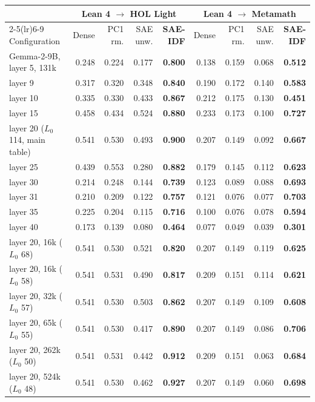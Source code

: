 \begin{tabular}{@{}lrrrrrrrr@{}}
\toprule
 & \multicolumn{4}{c}{Lean 4 $\to$ HOL Light} & \multicolumn{4}{c}{Lean 4 $\to$ Metamath} \\
\cmidrule(lr){2-5}\cmidrule(lr){6-9}
Configuration & Dense & PC1 rm. & SAE unw. & \textbf{SAE-IDF} & Dense & PC1 rm. & SAE unw. & \textbf{SAE-IDF} \\
\midrule
Gemma-2-9B, layer 5, 131k & 0.248 & 0.224 & 0.177 & \textbf{0.800} & 0.138 & 0.159 & 0.068 & \textbf{0.512} \\
layer 9 & 0.317 & 0.320 & 0.348 & \textbf{0.840} & 0.190 & 0.172 & 0.140 & \textbf{0.583} \\
layer 10 & 0.335 & 0.330 & 0.433 & \textbf{0.867} & 0.212 & 0.175 & 0.130 & \textbf{0.451} \\
layer 15 & 0.458 & 0.434 & 0.524 & \textbf{0.880} & 0.233 & 0.173 & 0.100 & \textbf{0.727} \\
layer 20 ($L_0$ 114, main table) & 0.541 & 0.530 & 0.493 & \textbf{0.900} & 0.207 & 0.149 & 0.092 & \textbf{0.667} \\
layer 25 & 0.439 & 0.553 & 0.280 & \textbf{0.882} & 0.179 & 0.145 & 0.112 & \textbf{0.623} \\
layer 30 & 0.214 & 0.248 & 0.144 & \textbf{0.739} & 0.123 & 0.089 & 0.088 & \textbf{0.693} \\
layer 31 & 0.210 & 0.209 & 0.122 & \textbf{0.757} & 0.121 & 0.076 & 0.077 & \textbf{0.703} \\
layer 35 & 0.225 & 0.204 & 0.115 & \textbf{0.716} & 0.100 & 0.076 & 0.078 & \textbf{0.594} \\
layer 40 & 0.173 & 0.139 & 0.080 & \textbf{0.464} & 0.077 & 0.049 & 0.039 & \textbf{0.301} \\
layer 20, 16k ($L_0$ 68) & 0.541 & 0.530 & 0.521 & \textbf{0.820} & 0.207 & 0.149 & 0.119 & \textbf{0.625} \\
layer 20, 16k ($L_0$ 58) & 0.541 & 0.531 & 0.490 & \textbf{0.817} & 0.209 & 0.151 & 0.114 & \textbf{0.621} \\
layer 20, 32k ($L_0$ 57) & 0.541 & 0.530 & 0.503 & \textbf{0.862} & 0.207 & 0.149 & 0.109 & \textbf{0.608} \\
layer 20, 65k ($L_0$ 55) & 0.541 & 0.530 & 0.417 & \textbf{0.890} & 0.207 & 0.149 & 0.086 & \textbf{0.706} \\
layer 20, 262k ($L_0$ 50) & 0.541 & 0.531 & 0.442 & \textbf{0.912} & 0.209 & 0.151 & 0.063 & \textbf{0.684} \\
layer 20, 524k ($L_0$ 48) & 0.541 & 0.530 & 0.462 & \textbf{0.927} & 0.207 & 0.149 & 0.060 & \textbf{0.698} \\

\end{tabular}
